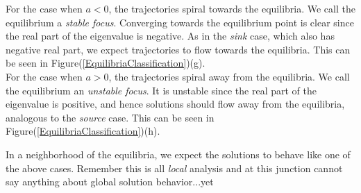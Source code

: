 \begin{itemize}
For the case when $a<0$, the trajectories spiral towards the equilibria. We call the equilibrium a \emph{stable focus}.  Converging towards the equilibrium point is clear since the real part of the eigenvalue is negative. As in the \emph{sink} case, which also has negative real part, we expect trajectories to flow towards the equilibria. This can be seen in Figure(\ref{EquilibriaClassification})(g). \\

For the case when $a>0$, the trajectories spiral away from the equilibria. We call the equilibrium an \emph{unstable focus}. It is unstable since the real part of the eigenvalue is positive, and hence solutions should flow away from the equilibria, analogous to the \emph{source} case. This can be seen in Figure(\ref{EquilibriaClassification})(h). \\

\end{itemize}

In a neighborhood of the equilibria, we expect the solutions to behave like one of the above cases. Remember this is all \emph{local} analysis and at this junction cannot say anything about global solution behavior...yet  \\